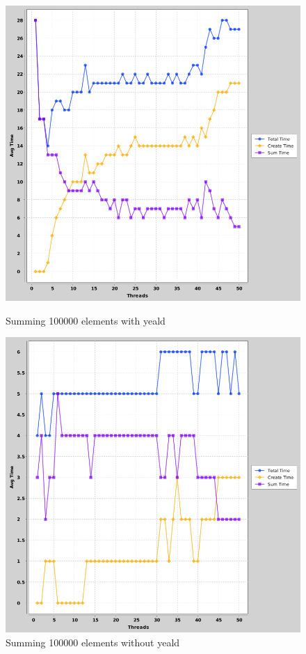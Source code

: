 \documentclass[a4paper, 12pt]{article}
\begin{document}
		
				\begin{figure}[H]
  \includegraphics[width=\linewidth]{threads-vs-time-100000-global.png}
  \caption{Summing 100000 elements with yeald}
\endminipage\hfill
{}
  \includegraphics[width=\linewidth]{threads-vs-time-100000-global-noyield.png}
  \caption{Summing 100000 elements without yeald}
\endminipage\hfill
		\end{figure}		
	
\end{document}
